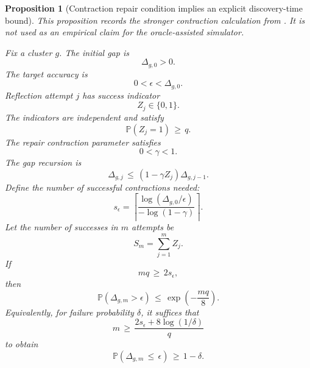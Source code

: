 \documentclass{article} %
\newtheorem{proposition}[theorem]{Proposition}
\begin{document}
\begin{proposition}[Contraction repair condition implies an explicit discovery-time bound]
\label{prop:14}
This proposition records the stronger contraction calculation from .  It is not used as an empirical claim for the oracle-assisted simulator.

Fix a cluster \(g\).  The initial gap is
\begin{equation}
\label{eq:app-fifth-contract-gap0}
\Delta_{g,0}>0.
\end{equation}
The target accuracy is
\begin{equation}
\label{eq:app-fifth-contract-eps}
0<\epsilon<\Delta_{g,0}.
\end{equation}
Reflection attempt \(j\) has success indicator
\begin{equation}
\label{eq:app-fifth-contract-Z}
Z_j\in\{0,1\}.
\end{equation}
The indicators are independent and satisfy
\begin{equation}
\label{eq:app-fifth-contract-q}
\mathbb{P}(Z_j=1)\,\ge\, q.
\end{equation}
The repair contraction parameter satisfies
\begin{equation}
\label{eq:app-fifth-contract-gamma}
0<\gamma<1.
\end{equation}
The gap recursion is
\begin{equation}
\label{eq:app-fifth-contract-recursion}
\Delta_{g,j}
\,\le\,
(1-\gamma Z_j)\Delta_{g,j-1}.
\end{equation}
Define the number of successful contractions needed:
\begin{equation}
\label{eq:app-fifth-contract-s}
s_\epsilon
=
\left\lceil
\frac{\log(\Delta_{g,0}/\epsilon)}
{-\log(1-\gamma)}
\right\rceil.
\end{equation}
Let the number of successes in \(m\) attempts be
\begin{equation}
\label{eq:app-fifth-contract-Sm}
S_m
=
\sum_{j=1}^{m}Z_j.
\end{equation}
If
\begin{equation}
\label{eq:app-fifth-contract-mq}
mq\,\ge\, 2s_\epsilon,
\end{equation}
then
\begin{equation}
\label{eq:app-fifth-contract-tail}
\mathbb{P}(\Delta_{g,m}>\epsilon)
\,\le\,
\exp\!\left(-\frac{mq}{8}\right).
\end{equation}
Equivalently, for failure probability \(\delta\), it suffices that
\begin{equation}
\label{eq:app-fifth-contract-m-delta}
m
\,\ge\,
\frac{2s_\epsilon+8\log(1/\delta)}{q}
\end{equation}
to obtain
\begin{equation}
\label{eq:app-fifth-contract-prob}
\mathbb{P}(\Delta_{g,m}\,\le\, \epsilon)
\,\ge\,
1-\delta.
\end{equation}
\end{proposition}
\end{document}
